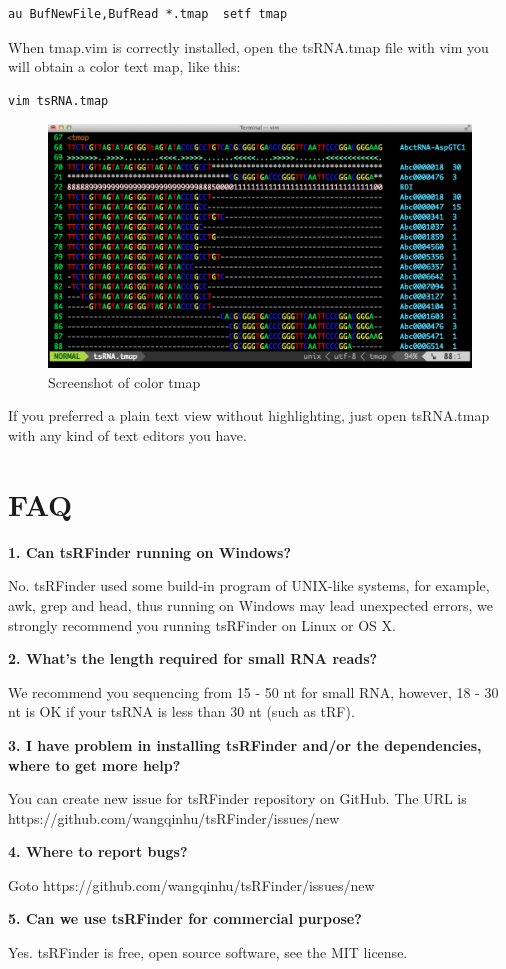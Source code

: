 \documentclass[11pt, a4paper]{article}
\begin{document}
\begin{verbatim}
au BufNewFile,BufRead *.tmap  setf tmap
\end{verbatim}

When tmap.vim is correctly installed, open the tsRNA.tmap file with vim you will obtain a color text map, like this:

\begin{verbatim}
vim tsRNA.tmap
\end{verbatim}

\begin{figure}[htbp]
\begin{center}
\includegraphics[width=12cm]{tmap.png}
\caption{Screenshot of color tmap} 
\label{tmap}
\end{center}
\end{figure}

If you preferred a plain text view without highlighting, just open tsRNA.tmap with any kind of text editors you have.

\section{FAQ}

\textbf{1. Can tsRFinder running on Windows?}

No. tsRFinder used some build-in program of UNIX-like systems, for example, awk, grep and head, thus running on Windows may lead unexpected errors, we strongly recommend you running tsRFinder on Linux or OS X.

\textbf{2. What's the length required for small RNA reads?}

We recommend you sequencing from 15 - 50 nt for small RNA, however, 18 - 30 nt is OK if your tsRNA is less than 30 nt (such as tRF).

\textbf{3. I have problem in installing tsRFinder and/or the dependencies, where to get more help?}

You can create new issue for tsRFinder repository on GitHub. The URL is https://github.com/wangqinhu/tsRFinder/issues/new

\textbf{4. Where to report bugs?}

Goto https://github.com/wangqinhu/tsRFinder/issues/new

\textbf{5. Can we use tsRFinder for commercial purpose?}

Yes. tsRFinder is free, open source software, see the MIT license.
\end{document}
